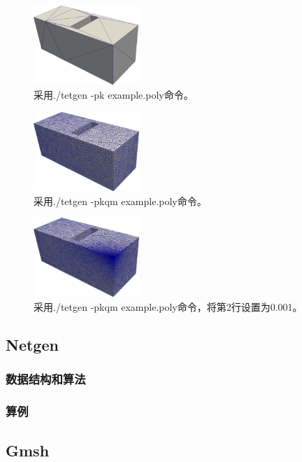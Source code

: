 \begin{figure}[!htbp]
  \centering
  \includegraphics[height=3cm]{fig/1/19.png}
  \caption{采用./tetgen -pk example.poly命令。}
  \label{fig:1-7}
\end{figure}

\begin{figure}[!htbp]
  \centering
  \includegraphics[height=3cm]{fig/1/17.png}
  \caption{采用./tetgen -pkqm example.poly命令。}
  \label{fig:1-7}
\end{figure}

\begin{figure}[!htbp]
  \centering
  \includegraphics[height=3cm]{fig/1/18.png}
  \caption{采用./tetgen -pkqm example.poly命令，将第2行设置为0.001。}
  \label{fig:1-7}
\end{figure}


\subsection{Netgen}

\subsubsection{数据结构和算法}

\subsubsection{算例}

\subsection{Gmsh}


